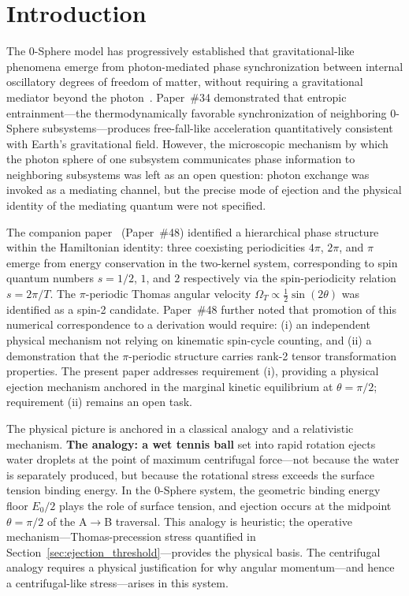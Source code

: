 \documentclass[%
 reprint, amsmath,amssymb, aps, prb, ]{revtex4-2}
\numberwithin{equation}{section}
\begin{document}
\maketitle

\section{Introduction}
\label{sec:introduction}

The 0-Sphere model has progressively established that gravitational-like phenomena emerge from photon-mediated phase synchronization between internal oscillatory degrees of freedom of matter, without requiring a gravitational mediator beyond the photon~\cite{hanamura34}. Paper~\#34 demonstrated that entropic entrainment---the thermodynamically favorable synchronization of neighboring 0-Sphere subsystems---produces free-fall-like acceleration quantitatively consistent with Earth's gravitational field. However, the microscopic mechanism by which the photon sphere of one subsystem communicates phase information to neighboring subsystems was left as an open question: photon exchange was invoked as a mediating channel, but the precise mode of ejection and the physical identity of the mediating quantum were not specified.

The companion paper~\cite{hanamura48} (Paper~\#48) identified a hierarchical phase structure within the Hamiltonian identity: three coexisting periodicities $4\pi$, $2\pi$, and $\pi$ emerge from energy conservation in the two-kernel system, corresponding to spin quantum numbers $s = 1/2$, $1$, and $2$ respectively via the spin-periodicity relation $s = 2\pi/T$. The $\pi$-periodic Thomas angular velocity $\Omega_T \propto \tfrac{1}{2}\sin(2\theta)$ was identified as a spin-2 candidate. Paper~\#48 further noted that promotion of this numerical correspondence to a derivation would require: (i) an independent physical mechanism not relying on kinematic spin-cycle counting, and (ii) a demonstration that the $\pi$-periodic structure carries rank-2 tensor transformation properties. The present paper addresses requirement (i), providing a physical ejection mechanism anchored in the marginal kinetic equilibrium at $\theta = \pi/2$; requirement (ii) remains an open task.

The physical picture is anchored in a classical analogy and a relativistic mechanism. \textbf{The analogy: a wet tennis ball} set into rapid rotation ejects water droplets at the point of maximum centrifugal force---not because the water is separately produced, but because the rotational stress exceeds the surface tension binding energy. In the 0-Sphere system, the geometric binding energy floor $E_0/2$ plays the role of surface tension, and ejection occurs at the midpoint $\theta = \pi/2$ of the A$\to$B traversal. This analogy is heuristic; the operative mechanism---Thomas-precession stress quantified in Section~\ref{sec:ejection_threshold}---provides the physical basis. The centrifugal analogy requires a physical justification for why angular momentum---and hence a centrifugal-like stress---arises in this system.
\end{document}

